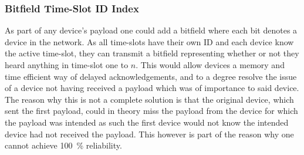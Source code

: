 \subsubsection*{Bitfield Time-Slot ID Index}
As part of any device's payload one could add a bitfield where each bit denotes a device in the network.
As all time-slots have their own ID and each device know the active time-slot, they can transmit a bitfield representing whether or not they heard anything in time-slot one to $n$.
This would allow devices a memory and time efficient way of delayed acknowledgements, and to a degree resolve the issue of a device not having received a payload which was of importance to said device.
The reason why this is not a complete solution is that the original device, which sent the first payload, could in theory miss the payload from the device for which the payload was intended as such the first device would not know the intended device had not received the payload.
This however is part of the reason why one cannot achieve 100~\% reliability.
